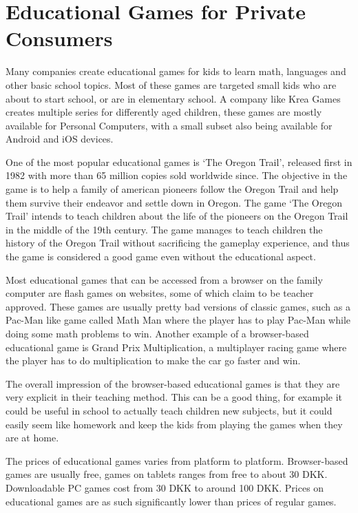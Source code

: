 \section{Educational Games for Private Consumers}
\label{sec:privateconsumers}
Many companies create educational games for kids to learn math, languages and other basic school topics. Most of these games are targeted small kids who are about to start school, or are in elementary school. A company like Krea Games\cite{kreagames} creates multiple series for differently aged children, these games are mostly available for Personal Computers, with a small subset also being available for Android and iOS devices.

One of the most popular educational games is `The Oregon Trail', released first in 1982 with more than 65 million copies sold worldwide since.\cite{oregontrail} The objective in the game is to help a family of american pioneers follow the Oregon Trail and help them survive their endeavor and settle down in Oregon.
The game `The Oregon Trail' intends to teach children about the life of the pioneers on the Oregon Trail in the middle of the 19th century. The game manages to teach children the history of the Oregon Trail without sacrificing the gameplay experience, and thus the game is considered a good game even without the educational aspect.

Most educational games that can be accessed from a browser on the family computer are flash games on websites, some of which claim to be teacher approved. These games are usually pretty bad versions of classic games, such as a Pac-Man like game called Math Man where the player has to play Pac-Man while doing some math problems to win.\cite{mathman} Another example of a browser-based educational game is Grand Prix Multiplication, a multiplayer racing game where the player has to do multiplication to make the car go faster and win.\cite{grandprix}

The overall impression of the browser-based educational games is that they are very explicit in their teaching method. This can be a good thing, for example it could be useful in school to actually teach children new subjects, but it could easily seem like homework and keep the kids from playing the games when they are at home.

The prices of educational games varies from platform to platform. Browser-based games are usually free, games on tablets ranges from free to about 30 DKK. Downloadable PC games cost from 30 DKK to around 100 DKK. Prices on educational games are as such significantly lower than prices of regular games.